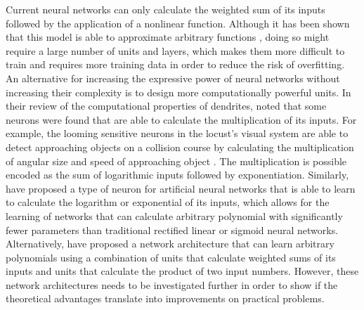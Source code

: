 Current neural networks can only calculate the weighted sum of its inputs
followed by the application of a nonlinear function. Although it has been shown
that this model is able to approximate arbitrary functions \citep{cybenko1989},
doing so might require a large number of units and layers, which makes them more
difficult to train and requires more training data in order to reduce the risk
of overfitting. An alternative for increasing the expressive power of neural
networks without increasing their complexity is to design more computationally
powerful units. In their review of the computational properties of dendrites,
\citet{london2005} noted that some neurons were found that are able to calculate
the multiplication of its inputs. For example, the looming sensitive neurons in
the locust's visual system are able to detect approaching objects on a collision
course by calculating the multiplication of angular size and speed of
approaching object \citep{london2005}. The multiplication is possible encoded as
the sum of logarithmic inputs followed by exponentiation. Similarly,
\citet{godfrey2016} have proposed a type of neuron for artificial neural
networks that is able to learn to calculate the logarithm or exponential of its
inputs, which allows for the learning of networks that can calculate arbitrary
polynomial with significantly fewer parameters than traditional rectified linear
or sigmoid neural networks. Alternatively, \citet{livni2013} have proposed a
network architecture that can learn arbitrary polynomials using a combination of
units that calculate weighted sums of its inputs and units that calculate the
product of two input numbers. However, these network architectures needs to be
investigated further in order to show if the theoretical advantages translate
into improvements on practical problems.
